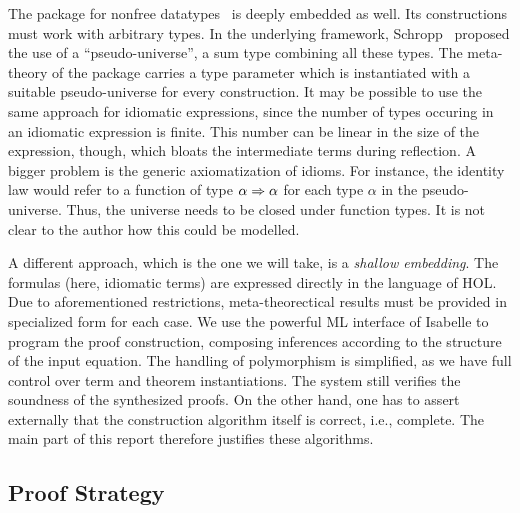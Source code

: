 The package for nonfree datatypes~\cite{schropp13} is deeply embedded as well.
Its constructions must work with arbitrary types.
In the underlying framework, Schropp~\cite{schropp12} proposed the use of a
``pseudo-universe'', a sum type combining all these types.
The meta-theory of the package carries a type parameter which is instantiated
with a suitable pseudo-universe for every construction.
It may be possible to use the same approach for idiomatic expressions, since the
number of types occuring in an idiomatic expression is finite.
This number can be linear in the size of the expression, though, which bloats
the intermediate terms during reflection.
A bigger problem is the generic axiomatization of idioms.
For instance, the identity law would refer to a function of type $\alpha \Rightarrow \alpha$
for each type $\alpha$ in the pseudo-universe.
Thus, the universe needs to be closed under function types.
It is not clear to the author how this could be modelled.

A different approach, which is the one we will take, is a \emph{shallow embedding}.
The formulas (here, idiomatic terms) are expressed directly in the language of HOL.
Due to aforementioned restrictions, meta-theorectical results must be provided
in specialized form for each case.
We use the powerful ML interface of Isabelle to program the proof construction,
composing inferences according to the structure of the input equation.
The handling of polymorphism is simplified, as we have full control over
term and theorem instantiations.
The system still verifies the soundness of the synthesized proofs.
On the other hand, one has to assert externally that the construction algorithm
itself is correct, i.e., complete.
The main part of this report therefore justifies these algorithms.


\subsection{Proof Strategy}\label{subsec:proof-strategy}

